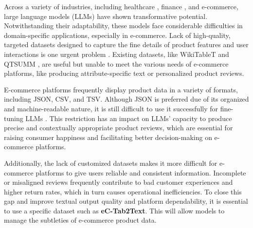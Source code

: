\label{section:problema}
Across a variety of industries, including healthcare \cite{He2023ReviewOS}, finance \cite{Varshney_2024}, and e-commerce, large language models (LLMs) have shown transformative potential. Notwithstanding their adaptability, these models face considerable difficulties in domain-specific applications, especially in e-commerce. Lack of high-quality, targeted datasets designed to capture the fine details of product features and user interactions is one urgent problem \cite{macková2023promap}. Existing datasets, like WikiTableT \cite{chen2021wikitabletlargescaledatatotextdataset} and QTSUMM \cite{zhao2023qtsummqueryfocusedsummarizationtabular}, are useful but unable to meet the various needs of e-commerce platforms, like producing attribute-specific text or personalized product reviews.

E-commerce platforms frequently display product data in a variety of formats, including JSON, CSV, and TSV. Although JSON is preferred due of its organized and machine-readable nature, it is still difficult to use it successfully for fine-tuning LLMs \cite{gao2024jsontuning}. This restriction has an impact on LLMs' capacity to produce precise and contextually appropriate product reviews, which are essential for raising consumer happiness and facilitating better decision-making on e-commerce platforms.

Additionally, the lack of customized datasets makes it more difficult for e-commerce platforms to give users reliable and consistent information. Incomplete or misaligned reviews frequently contribute to bad customer experiences and higher return rates, which in turn causes operational inefficiencies. To close this gap and improve textual output quality and platform dependability, it is essential to use a specific dataset such as \textbf{eC-Tab2Text}. This will allow models to manage the subtleties of e-commerce product data.
